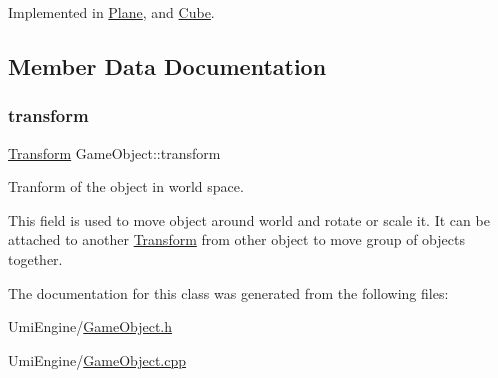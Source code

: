 Implemented in \mbox{\hyperlink{class_plane_af1ed004221fa7b42136789cb2c48b124}{Plane}}, and \mbox{\hyperlink{class_cube_a52a6950310f4529d9a3df4bc60c0625b}{Cube}}.



\subsection{Member Data Documentation}
\mbox{\label{class_game_object_ad2de7705e8d1d7b5d0014448dd13f99a}} 
\subsubsection{\texorpdfstring{transform}{transform}}
{\footnotesize\ttfamily \mbox{\hyperlink{class_transform}{Transform}} Game\+Object\+::transform}



Tranform of the object in world space. 

This field is used to move object around world and rotate or scale it. It can be attached to another \mbox{\hyperlink{class_transform}{Transform}} from other object to move group of objects together. 

The documentation for this class was generated from the following files\+:\begin{DoxyCompactItemize}
\item 
Umi\+Engine/\mbox{\hyperlink{_game_object_8h}{Game\+Object.\+h}}\item 
Umi\+Engine/\mbox{\hyperlink{_game_object_8cpp}{Game\+Object.\+cpp}}\end{DoxyCompactItemize}
